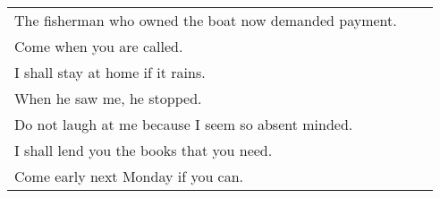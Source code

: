\begin{tabular}{l|l l }
The fisherman who owned the boat now demanded payment. & &\\
 
Come when you are called. & &\\
 
I shall stay at home if it rains. & &\\
 
When he saw me, he stopped. & &\\
 
Do not laugh at me because I seem so absent minded. & &\\
 
I shall lend you the books that you need. & &\\
 
Come early next Monday if you can. & &\\
 

\end{tabular}


